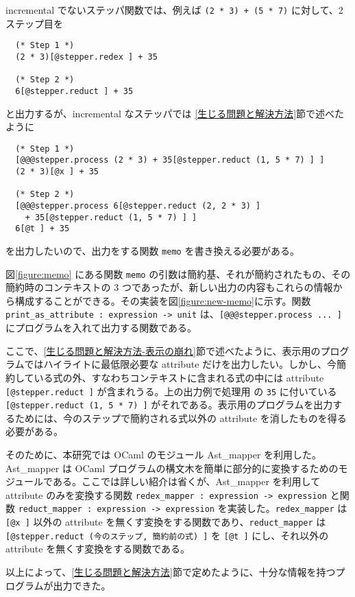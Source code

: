 incremental でないステッパ関数では、例えば \texttt{(2 * 3) + (5 * 7)} に対して、2 ステップ目を
\begin{verbatim}
  (* Step 1 *)
  (2 * 3)[@stepper.redex ] + 35

  (* Step 2 *)
  6[@stepper.reduct ] + 35
\end{verbatim}
と出力するが、incremental なステッパでは \ref{生じる問題と解決方法}節で述べたように
\begin{verbatim}
  (* Step 1 *)
  [@@@stepper.process (2 * 3) + 35[@stepper.reduct (1, 5 * 7) ] ]
  (2 * 3)[@x ] + 35

  (* Step 2 *)
  [@@@stepper.process 6[@stepper.reduct (2, 2 * 3) ]
    + 35[@stepper.reduct (1, 5 * 7) ] ]
  6[@t ] + 35
\end{verbatim}
を出力したいので、出力をする関数 \texttt{memo} を書き換える必要がある。

図\ref{figure:memo} にある関数 \texttt{memo} の引数は簡約基、それが簡約されたもの、その簡約時のコンテキストの 3 つであったが、新しい出力の内容もこれらの情報から構成することができる。その実装を図\ref{figure:new-memo}に示す。関数 \texttt{print\_as\_attribute : expression -> unit} は、\texttt{[@@@stepper.process ... ]} にプログラムを入れて出力する関数である。

ここで、\ref{生じる問題と解決方法-表示の崩れ}節で述べたように、表示用のプログラムではハイライトに最低限必要な attribute だけを出力したい。しかし、今簡約している式の外、すなわちコンテキストに含まれる式の中には attribute \texttt{[@stepper.reduct ]} が含まれうる。上の出力例で処理用
の \texttt{35} に付いている \texttt{[@stepper.reduct (1, 5 * 7) ]} がそれである。表示用のプログラムを出力するためには、今のステップで簡約される式以外の attribute を消したものを得る必要がある。

そのために、本研究では OCaml のモジュール Ast\_mapper を利用した。Ast\_mapper は OCaml プログラムの構文木を簡単に部分的に変換するためのモジュールである。ここでは詳しい紹介は省くが、Ast\_mapper を利用して attribute のみを変換する関数 \texttt{redex\_mapper : expression -> expression} と関数 \texttt{reduct\_mapper : expression -> expression} を実装した。\texttt{redex\_mapper} は \texttt{[@x ]} 以外の attribute を無くす変換をする関数であり、\texttt{reduct\_mapper} は \texttt{[@stepper.reduct (今のステップ, 簡約前の式) ]} を \texttt{[@t ]} にし、それ以外の attribute を無くす変換をする関数である。

以上によって、\ref{生じる問題と解決方法}節で定めたように、十分な情報を持つプログラムが出力できた。

